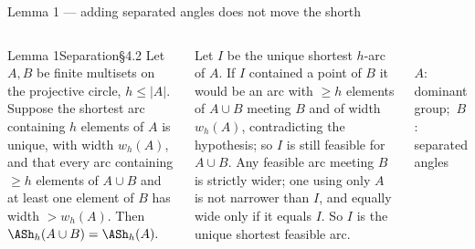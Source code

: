 \documentclass[aspectratio=169,9pt]{beamer}
\newcommand{\cR}{2.0}
\newcommand{\pdot}[2]{\fill[#2] ({\cR*cos(2*#1)},{\cR*sin(2*#1)}) circle (1.7pt);}
\newcommand{\projcircle}[1][30]{%
  \draw[mute,line width=0.9pt] (0,0) circle (\cR);
  \foreach \a in {0,#1,...,150}{%
    \draw[mute] ({(\cR-0.05)*cos(2*\a)},{(\cR-0.05)*sin(2*\a)}) -- ({(\cR+0.05)*cos(2*\a)},{(\cR+0.05)*sin(2*\a)});
    \node[font=\sffamily\tiny,mute] at ({(\cR+0.3)*cos(2*\a)},{(\cR+0.3)*sin(2*\a)}) {$\a^\circ$};}}
\newcommand{\arcdeg}[4]{%
  \draw[#3,line width=2.4pt,line cap=round] plot[domain=2*#1:2*#2,samples=40] ({(\cR+#4)*cos(\x)},{(\cR+#4)*sin(\x)});}
\begin{document}
\begin{frame}{Lemma 1 --- adding separated angles does not move the shorth}
\begin{columns}[T]
\begin{rthm}{Lemma 1}{Separation}{\S4.2}
Let $A,B$ be finite multisets on the projective circle, $h\le|A|$. Suppose the shortest arc containing $h$ elements of $A$ is unique, with width $w_h(A)$, and that every arc containing $\ge h$ elements of $A\cup B$ and at least one element of $B$ has width $>w_h(A)$. Then
$\ASh_h(A\cup B)=\ASh_h(A).$
\end{rthm}
\begin{rproof}
Let $I$ be the unique shortest $h$-arc of $A$. If $I$ contained a point of $B$ it would be an arc with $\ge h$ elements of $A\cup B$ meeting $B$ and of width $w_h(A)$, contradicting the hypothesis; so $I$ is still feasible for $A\cup B$. Any feasible arc meeting $B$ is strictly wider; one using only $A$ is not narrower than $I$, and equally wide only if it equals $I$. So $I$ is the unique shortest feasible arc.
\end{rproof}
\centering
{}\\[2pt]
{\sffamily\scriptsize\color{mute}\textcolor{cmaj}{$A$}: dominant group;\ \textcolor{cbad}{$B$}: separated angles}
\end{columns}
\end{frame}
\end{document}
